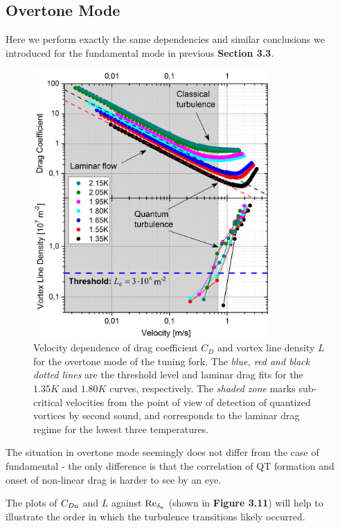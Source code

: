 \newpage


\subsection*{Overtone Mode}

Here we perform exactly the same dependencies and similar conclusions we introduced for the fundamental mode in previous {\sffamily\textbf{Section 3.3}}.

\begin{figure}[h!]
	\centering
	\includegraphics[width=0.8\textwidth]{graphs/Merged_C+L_over}
	\caption{Velocity dependence of drag coefficient $ C_D $ and vortex line density $ L $ for the overtone mode of the tuning fork. The \textit{blue, red and black dotted lines} are the threshold level and laminar drag fits for the $ 1.35\unit{K} $ and $ 1.80\unit{K} $ curves, respectively. The \textit{shaded zone} marks sub-critical velocities from the point of view of detection of quantized vortices by second sound, and corresponds to the laminar drag regime for the lowest three temperatures.}
\end{figure}

The situation in overtone mode seemingly does not differ from the case of fundamental - the only difference is that the correlation of QT formation and onset of non-linear drag is harder to see by an eye.

The plots of $ C_{D\mathrm{n}} $ and $ L $ against $ \text{Re}_{\delta_{\mathrm{n}}} $ (shown in {\sffamily\textbf{Figure 3.11}}) will help to illustrate the order in which the turbulence transitions likely occurred.


